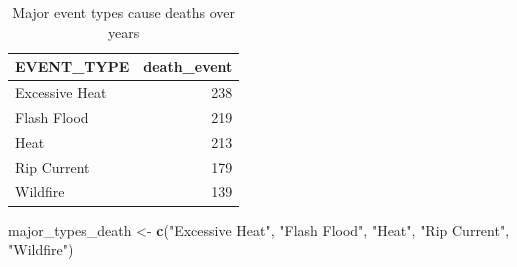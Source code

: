 \documentclass[
]{article}
\newenvironment{Shaded}{\begin{snugshade}}{\end{snugshade}}
\newcommand{\DataTypeTok}[1]{\textcolor[rgb]{0.13,0.29,0.53}{#1}}
\newcommand{\DecValTok}[1]{\textcolor[rgb]{0.00,0.00,0.81}{#1}}
\newcommand{\KeywordTok}[1]{\textcolor[rgb]{0.13,0.29,0.53}{\textbf{#1}}}
\newcommand{\NormalTok}[1]{#1}
\newcommand{\OperatorTok}[1]{\textcolor[rgb]{0.81,0.36,0.00}{\textbf{#1}}}
\newcommand{\StringTok}[1]{\textcolor[rgb]{0.31,0.60,0.02}{#1}}
\begin{document}
\begin{Shaded}
\end{Shaded}

\begin{table}[!h]

\caption{\label{tab:tab2}Major event types cause deaths over years}
\centering
\begin{tabular}[t]{lr}
\toprule
EVENT\_TYPE & death\_event\\
\midrule
\rowcolor{gray!6}  Excessive Heat & 238\\
Flash Flood & 219\\
\rowcolor{gray!6}  Heat & 213\\
Rip Current & 179\\
\rowcolor{gray!6}  Wildfire & 139\\
\bottomrule
\end{tabular}
\end{table}

\begin{Shaded}
\begin{Highlighting}[]
\NormalTok{major_types_death <-}\StringTok{ }\KeywordTok{c}\NormalTok{(}\StringTok{"Excessive Heat"}\NormalTok{, }\StringTok{"Flash Flood"}\NormalTok{, }\StringTok{"Heat"}\NormalTok{, }\StringTok{"Rip Current"}\NormalTok{, }\StringTok{"Wildfire"}\NormalTok{)}
\end{Highlighting}
\end{Shaded}
\end{document}
